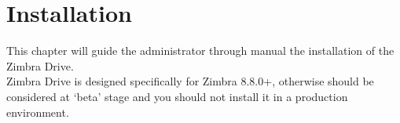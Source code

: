 \chapter{Installation}

This chapter will guide the administrator through manual the installation of the Zimbra Drive.\\
Zimbra Drive is designed specifically for Zimbra 8.8.0+, otherwise should be considered at `beta'
stage and you should not install it in a production environment.



